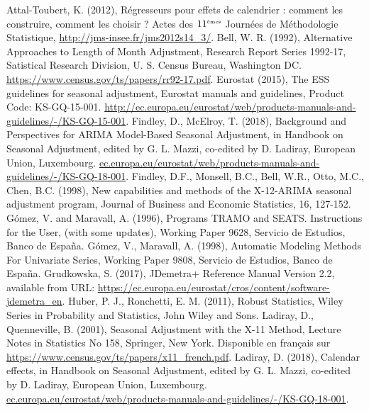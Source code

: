 \documentclass[12pt, a4paper, french]{article}
\begin{document}
\newpage
 
\nocite{*}
\begin{thebibliography}{999}
 Attal-Toubert, K. (2012), Régresseurs pour effets de calendrier : comment les construire, comment les choisir ? Actes des $11^{\mbox{\tiny èmes}}$ Journées de Méthodologie Statistique, \url{http://jms-insee.fr/jms2012s14_3/}.
 Bell, W. R. (1992), Alternative Approaches to Length of Month Adjustment, Research Report Series 1992-17, Satistical Research Division, U. S. Census Bureau, Washington DC. \url{https://www.census.gov/ts/papers/rr92-17.pdf}.
 Eurostat (2015), The ESS guidelines for seasonal adjustment, Eurostat manuals and guidelines, Product Code: KS-GQ-15-001. \url{http://ec.europa.eu/eurostat/web/products-manuals-and-guidelines/-/KS-GQ-15-001}.
 Findley, D., McElroy, T. (2018), Background and Perspectives for ARIMA Model-Based Seasonal Adjustment, in Handbook on Seasonal Adjustment, edited by G. L. Mazzi, co-edited by D. Ladiray, European Union, Luxembourg. \url{ec.europa.eu/eurostat/web/products-manuals-and-guidelines/-/KS-GQ-18-001}.
 Findley, D.F., Monsell, B.C., Bell, W.R., Otto, M.C., Chen, B.C. (1998), New capabilities and methods of the X-12-ARIMA seasonal adjustment program, Journal of Business and Economic Statistics, 16, 127-152.
 G\'{o}mez, V. and Maravall, A. (1996), Programs TRAMO and SEATS. Instructions for the User, (with some updates), Working Paper 9628, Servicio de Estudios, Banco de Espa\~{n}a.
 G\'{o}mez, V., Maravall, A. (1998), Automatic Modeling Methods For Univariate Series, Working Paper 9808, Servicio de Estudios, Banco de Espa\~{n}a.
 	Grudkowska, S. (2017),	JDemetra+ Reference Manual Version 2.2, available from URL: \url{https://ec.europa.eu/eurostat/cros/content/software-jdemetra_en}.
 Huber, P. J., Ronchetti, E. M. (2011), Robust Statistics, Wiley Series in Probability and Statistics, John Wiley and Sons.
 Ladiray, D., Quenneville, B. (2001), Seasonal Adjustment with the X-11 Method, Lecture Notes in Statistics No 158, Springer, New York. Disponible en français sur \url{https://www.census.gov/ts/papers/x11_french.pdf}.
 Ladiray, D. (2018), Calendar effects, in Handbook on Seasonal Adjustment, edited by G. L. Mazzi, co-edited by D. Ladiray, European Union, Luxembourg. \url{ec.europa.eu/eurostat/web/products-manuals-and-guidelines/-/KS-GQ-18-001}.

\end{thebibliography}
\end{document}
